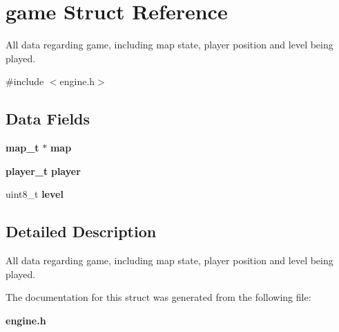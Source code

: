 \section{game Struct Reference}
\label{structgame}


All data regarding game, including map state, player position and level being played.  




{\ttfamily \#include $<$engine.\+h$>$}

\subsection*{Data Fields}
\begin{DoxyCompactItemize}
\item 
{\bf map\+\_\+t} $\ast$ {\bfseries map}\label{structgame_af2bb9dc718068dc88b8250185d0d6ab7}

\item 
{\bf player\+\_\+t} {\bfseries player}\label{structgame_ac5a8201c5f6bbce303ec36500d67b6d8}

\item 
uint8\+\_\+t {\bfseries level}\label{structgame_abbb6c7c49508c1ac374683f2d1159e08}

\end{DoxyCompactItemize}


\subsection{Detailed Description}
All data regarding game, including map state, player position and level being played. 

The documentation for this struct was generated from the following file\+:\begin{DoxyCompactItemize}
\item 
{\bf engine.\+h}\end{DoxyCompactItemize}
